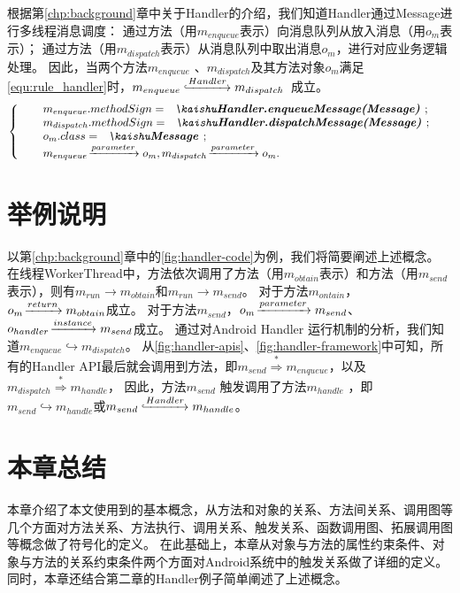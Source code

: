 根据第\ref{chp:background}章中关于{Handler}的介绍，我们知道{Handler}通过{Message}进行多线程消息调度：
通过方法（用$m_{enqueue}$表示）向消息队列从放入消息（用$o_m$表示）；
通过方法（用$m_{dispatch}$表示）从消息队列中取出消息$o_m$，进行对应业务逻辑处理。
因此，当两个方法$m_{enqueue}$ 、$m_{dispatch}$及其方法对象$o_{m}$满足\autoref{equ:rule_handler}时，$m_{enqueue} \lhook\joinrel\xrightarrow{Handler}  m_{dispatch}  $ 成立。
{ 
	\equwuhao
\begin{equation}
\left\{  
\begin{array}{ll}
&m_{enqueue}.methodSign = \text{\codeInEqu{Handler.enqueueMessage(Message)}};\\
&m_{dispatch}.methodSign = \text{\codeInEqu{Handler.dispatchMessage(Message)}};\\
& o_m.class =   \text{\codeInEqu{Message}}; \\
 &m_{enqueue}\joinrel\xrightarrow{parameter} o_m  , m_{dispatch}\joinrel\xrightarrow{parameter} o_m.
\end{array}  
\right.  
\label{equ:rule_handler} 
\end{equation}
}

\section{举例说明}



以第\ref{chp:background}章中的\autoref{fig:handler-code}为例，我们将简要阐述上述概念。
在线程WorkerThread中，方法依次调用了方法（用$m_{obtain}$表示）和方法（用$m_{send}$表示），则有$m_{run} \to m_{obtain} $和$m_{run} \to m_{send}$。
对于方法$m_{ontain}$，$o_{m} \joinrel\xrightarrow{return} m_{obtain} $成立。
对于方法$m_{send}$，$o_{m} \joinrel\xrightarrow{parameter} m_{send} $、$o_{handler} \joinrel\xrightarrow{instance} m_{send} $成立。
通过对Android Handler 运行机制的分析，我们知道$m_{enqueue} \hookrightarrow m_{dispatch}$。
从\autoref{fig:handler-apis}、\autoref{fig:handler-framework}中可知，所有的Handler API最后就会调用到方法，即$m_{send} \stackrel{\ast	}{\Rightarrow} m_{enqueue} $，以及$m_{dispatch} \stackrel{\ast}{\Rightarrow}  m_{handle}$，
因此，方法$m_{send}$ 触发调用了方法$m_{handle}$ ，即$m_{send} \hookrightarrow m_{handle}$或$m_{send} \lhook\joinrel\xrightarrow{Handler}  m_{handle} $。

\section{本章总结}

本章介绍了本文使用到的基本概念，从方法和对象的关系、方法间关系、调用图等几个方面对方法关系、方法执行、调用关系、触发关系、函数调用图、拓展调用图等概念做了符号化的定义。
在此基础上，本章从对象与方法的属性约束条件、对象与方法的关系约束条件两个方面对Android系统中的触发关系做了详细的定义。
同时，本章还结合第二章的Handler例子简单阐述了上述概念。
